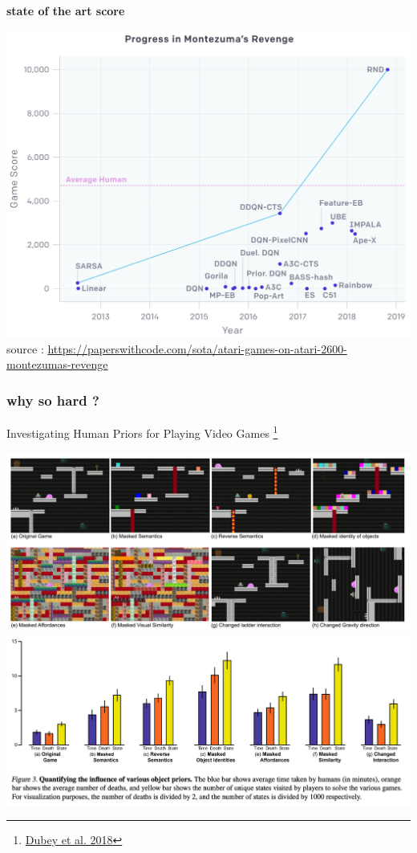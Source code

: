 \documentclass{beamer}
\begin{document}
  
  \begin{frame}{\bf state of the art score}

  \centering
  \includegraphics[scale=0.2]{../images/montezuma_progress.png}
  source : \url{https://paperswithcode.com/sota/atari-games-on-atari-2600-montezumas-revenge}
  
\end{frame}



\begin{frame}
  
  \frametitle{why so hard ?} 

  {Investigating Human Priors for Playing Video Games \footnote{\href{https://arxiv.org/pdf/1802.10217.pdf}{Dubey et al. 2018}} }

  \centering
  \includegraphics[scale=0.25]{../papers_captions/human_priors_0.png}
  \includegraphics[scale=0.25]{../papers_captions/human_priors_1.png}
  
\end{frame}
\end{document}
